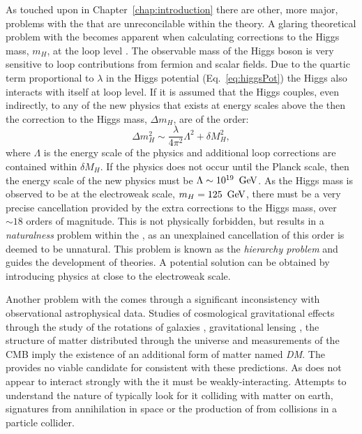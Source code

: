 As touched upon in Chapter~\ref{chap:introduction} there are other,
more major, problems with the \SM that are unreconcilable within the
theory. A glaring theoretical problem with the \SM becomes apparent
when calculating corrections to the Higgs mass, $m_H$, at the loop
level \cite{Martin:1997ns}. The observable mass of the Higgs boson is
very sensitive to loop contributions from fermion and scalar fields.
Due to the quartic term proportional to $\lambda$ in the Higgs
potential (Eq.~\ref{eq:higgsPot}) the Higgs also interacts with itself
at loop level. If it is assumed that the Higgs couples, even indirectly, to
any of the new physics that exists at energy scales above the \SM then the
correction to the Higgs mass, $\Delta m_H$, are of the order:
\begin{equation}
\Delta m_H^2 \sim \frac{\lambda}{4\pi^2}\Lambda^2+\delta M_H^2,
\end{equation}
where $\Lambda$ is the energy scale of the \BSM physics and additional
loop corrections are contained within $\delta M_H$. If the \BSM
physics does not occur until the Planck scale, then the energy scale
of the new physics must be $\Lambda\sim 10^{19}~\mathrm{\,Ge\kern -0.1em V}$. As the Higgs
mass is observed to be at the electroweak scale, $m_H=125~\mathrm{\,Ge\kern -0.1em V}$, there
must be a very precise cancellation provided by the extra corrections
to the Higgs mass, over $\sim18$ orders of magnitude. This is not
physically forbidden, but results in a \emph{naturalness} problem
within the \SM, as an unexplained cancellation of this order is deemed to
be unnatural. This problem is known as the \emph{hierarchy problem}
and guides the development of \BSM theories. A potential solution can
be obtained by introducing \BSM physics at close to the electroweak scale.

Another problem with the \SM comes through a significant inconsistency
with observational astrophysical data. Studies of cosmological
gravitational effects through the study of the rotations of galaxies
\cite{Kapteyn:1922zz,Oort:436532}, gravitational lensing
\cite{Markevitch:2003at}, the structure of matter distributed through
the universe \cite{2012Natur.487..202D} and measurements of the
\ac{CMB} \cite{Ade:2015xua,0067-0049-180-2-225} imply the
existence of an additional form of matter named \emph{\acf{DM}}. The
\SM provides no viable candidate for \DM consistent with these
predictions. As \DM does not appear to interact strongly
with the \SM it must be weakly-interacting. Attempts to understand the
nature of \DM typically look for it colliding with matter on earth,
signatures from \DM annihilation in space or the production of \DM
from \SM collisions in a particle collider.


